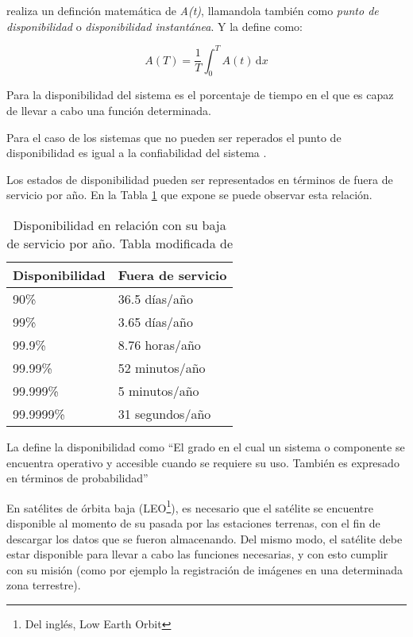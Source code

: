\cite{FTDesign} realiza un definción matemática de \textit{A(t)}, llamandola también como
\textit{punto de disponibilidad} o \textit{disponibilidad instantánea}. Y la define como:

$$A(T) = \frac{1}{T} \int_0^T \! A(t) \, \mathrm{d}x $$

Para \cite{Hanmer07} la disponibilidad del sistema es el porcentaje de tiempo en el que es capaz de
llevar a cabo una función determinada.

Para el caso de los sistemas que no pueden ser reperados el punto de disponibilidad es igual a la
confiabilidad del sistema \citep{FTDesign}.

Los estados de disponibilidad pueden ser representados en términos de fuera de servicio por año. En
la Tabla \ref{table:avalVSdowntime} que expone \cite{FTDesign} se puede observar esta relación.

\begin{table}[h]
  \centering
  \begin{tabular}{l|l}
    \hline
    Disponibilidad & Fuera de servicio \\ \hline
    90\%           & 36.5 días/año     \\
    99\%           & 3.65 días/año     \\
    99.9\%         & 8.76 horas/año    \\
    99.99\%        & 52 minutos/año    \\
    99.999\%       & 5 minutos/año     \\
    99.9999\%      & 31 segundos/año   \\ \hline
  \end{tabular}
  \caption{Disponibilidad en relación con su baja de servicio por año. Tabla
modificada de \protect\cite{FTDesign}}
  \label{table:avalVSdowntime}
\end{table}

La \cite{IEEE610.12} define la disponibilidad como ``El grado en el cual un sistema o
componente se encuentra operativo y accesible cuando se requiere su uso. También es expresado en
términos de probabilidad''

En satélites de órbita baja (LEO\footnote{Del inglés, Low Earth Orbit}), es necesario que el
satélite se encuentre disponible al momento de su pasada por las estaciones terrenas, con el fin de 
descargar los datos que se fueron almacenando. Del mismo modo, el satélite debe estar disponible
para llevar a cabo las funciones necesarias, y con esto cumplir con su misión (como por ejemplo la
registración de imágenes en una determinada zona terrestre).


